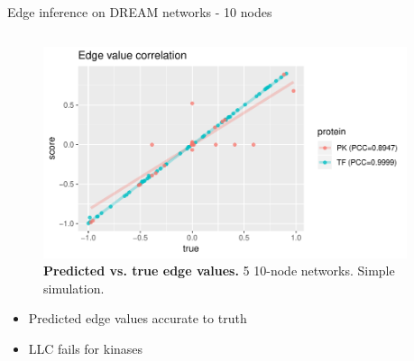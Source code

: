 \begin{frame}{Edge inference on DREAM networks - 10 nodes}
\label{sec:dream_results}
\begin{columns}
\begin{column}{0.4\textwidth}

\begin{figure}[ht]
    \centering
    \includegraphics[width=\textwidth]{analysis/fig/edge_cor_10.pdf}
    \caption{\textbf{Predicted vs. true edge values.} 5 10-node networks. Simple simulation. }
    \label{fig:edge_value_cor_10}
\end{figure}

\begin{itemize}
    \item Predicted edge values accurate to truth
    \item LLC fails for kinases
\end{itemize}
\end{column}
\begin{column}{0.6\textwidth}


\end{column}
\end{columns}
\end{frame}
